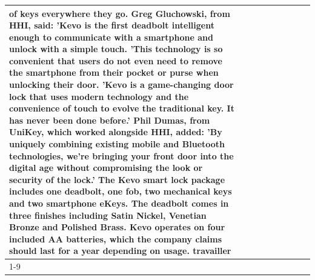\begin{table}[H]
\begin{tabular}{lllrlllll}
of keys everywhere they go. Greg Gluchowski, from HHI, said: 'Kevo is the first deadbolt intelligent enough to communicate with a smartphone and unlock with a simple touch. 'This technology is so convenient that users do not even need to remove the smartphone from their pocket or purse when unlocking their door. 'Kevo is a game-changing door lock that uses modern technology and the convenience of touch to evolve the traditional key. It has never been done before.' Phil Dumas, from UniKey, which worked alongside HHI, added: 'By uniquely combining existing mobile and Bluetooth technologies, we’re bringing your front door into the digital age without compromising the look or security of the lock.' The Kevo smart lock package includes one deadbolt, one fob, two mechanical keys and two smartphone eKeys. The deadbolt comes in three finishes including Satin Nickel, Venetian Bronze and Polished Brass. Kevo operates on four included AA batteries, which the company claims should last for a year depending on usage. travailler \\
\cline{1-9}

\end{tabular}
\end{table}
